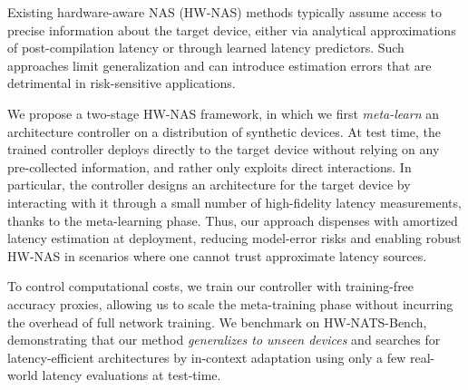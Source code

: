 Existing hardware-aware NAS (HW-NAS) methods typically assume access to precise information about the target device, either via analytical approximations of post-compilation latency or through learned latency predictors. Such approaches limit generalization and can introduce estimation errors that are detrimental in risk-sensitive applications.

We propose a two-stage HW-NAS framework, in which we first \emph{meta-learn} an architecture controller on a distribution of synthetic devices. At test time, the trained controller deploys directly to the target device without relying on any pre-collected information, and rather only exploits direct interactions. In particular, the controller designs an architecture for the target device by interacting with it through a small number of high-fidelity latency measurements, thanks to the meta-learning phase. Thus, our approach dispenses with amortized latency estimation at deployment, reducing model-error risks and enabling robust HW-NAS in scenarios where one cannot trust approximate latency sources.

To control computational costs, we train our controller with training-free accuracy proxies, allowing us to scale the meta-training phase without incurring the overhead of full network training. We benchmark on HW-NATS-Bench, demonstrating that our method \emph{generalizes to unseen devices} and searches for latency-efficient architectures by in-context adaptation using only a few real-world latency evaluations at test-time.